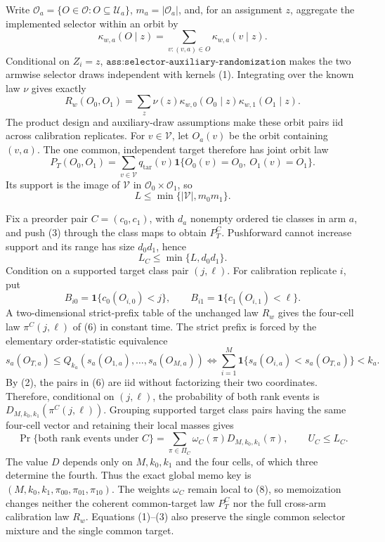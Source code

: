 Write \(\mathcal O_a=\{O\in\mathcal O:O\subseteq\mathcal U_a\}\), \(m_a=|\mathcal O_a|\), and, for an assignment \(z\), aggregate the implemented selector within an orbit by
\[
\kappa_{w,a}(O\mid z)=\sum_{v:(v,a)\in O}\kappa_{w,a}(v\mid z).
\tag{1}
\]
Conditional on \(Z_i=z\), \(\texttt{ass:selector-auxiliary-randomization}\) makes the two armwise selector draws independent with kernels (1). Integrating over the known law \(\nu\) gives exactly
\[
R_w(O_0,O_1)=\sum_z\nu(z)\kappa_{w,0}(O_0\mid z)\kappa_{w,1}(O_1\mid z).
\tag{2}
\]
The product design and auxiliary-draw assumptions make these orbit pairs iid across calibration replicates. For \(v\in\mathcal V\), let \(O_a(v)\) be the orbit containing \((v,a)\). The one common, independent target therefore has joint orbit law
\[
P_T(O_0,O_1)=\sum_{v\in\mathcal V}q_{\mathrm{tar}}(v)\mathbf 1\{O_0(v)=O_0,\ O_1(v)=O_1\}.
\tag{3}
\]
Its support is the image of \(\mathcal V\) in \(\mathcal O_0\times\mathcal O_1\), so
\[
L\le\min\{|\mathcal V|,m_0m_1\}.
\tag{4}
\]

Fix a preorder pair \(C=(c_0,c_1)\), with \(d_a\) nonempty ordered tie classes in arm \(a\), and push (3) through the class maps to obtain \(P_T^C\). Pushforward cannot increase support and its range has size \(d_0d_1\), hence
\[
L_C\le\min\{L,d_0d_1\}.
\tag{5}
\]
Condition on a supported target class pair \((j,\ell)\). For calibration replicate \(i\), put
\[
B_{i0}=\mathbf 1\{c_0(O_{i,0})<j\},\qquad B_{i1}=\mathbf 1\{c_1(O_{i,1})<\ell\}.
\tag{6}
\]
A two-dimensional strict-prefix table of the unchanged law \(R_w\) gives the four-cell law \(\pi^C(j,\ell)\) of (6) in constant time. The strict prefix is forced by the elementary order-statistic equivalence
\[
s_a(O_{T,a})\le Q_{k_a}(s_a(O_{1,a}),\ldots,s_a(O_{M,a}))
\iff
\sum_{i=1}^M\mathbf 1\{s_a(O_{i,a})<s_a(O_{T,a})\}<k_a.
\tag{7}
\]
By (2), the pairs in (6) are iid without factorizing their two coordinates. Therefore, conditional on \((j,\ell)\), the probability of both rank events is \(D_{M,k_0,k_1}(\pi^C(j,\ell))\). Grouping supported target class pairs having the same four-cell vector and retaining their local masses gives
\[
\Pr\{\text{both rank events under }C\}=\sum_{\pi\in\Pi_C}\omega_C(\pi)D_{M,k_0,k_1}(\pi),\qquad U_C\le L_C.
\tag{8}
\]
The value \(D\) depends only on \(M,k_0,k_1\) and the four cells, of which three determine the fourth. Thus the exact global memo key is \((M,k_0,k_1,\pi_{00},\pi_{01},\pi_{10})\). The weights \(\omega_C\) remain local to (8), so memoization changes neither the coherent common-target law \(P_T^C\) nor the full cross-arm calibration law \(R_w\). Equations (1)--(3) also preserve the single common selector mixture and the single common target.

